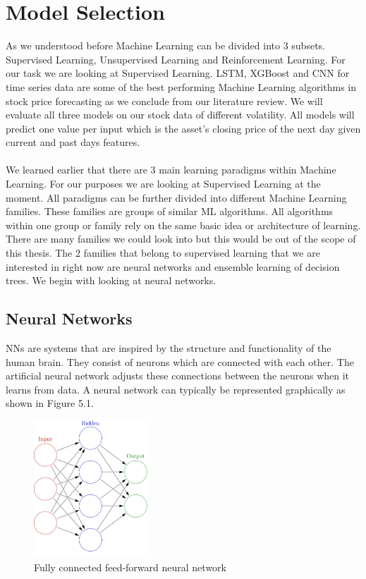 \documentclass[a4paper,12pt]{report}
\begin{document}
	\section{Model Selection}
	As we understood before Machine Learning can be divided into 3 subsets. Supervised Learning, Unsupervised Learning and Reinforcement Learning. For our task we are looking at Supervised Learning. LSTM, XGBoost and CNN for time series data are some of the best performing Machine Learning algorithms in stock price forecasting as we conclude from our literature review. We will evaluate all three models on our stock data of different volatility. All models will predict one value per input which is the asset's closing price of the next day given current and past days features.\\
	\\
	We learned earlier that there are 3 main learning paradigms within Machine Learning. For our purposes we are looking at Supervised Learning at the moment. All paradigms can be further divided into different Machine Learning families. These families are groups of similar ML algorithms. All algorithms within one group or family rely on the same basic idea or architecture of learning. There are many families we could look into but this would be out of the scope of this thesis. The 2 families that belong to supervised learning that we are interested in right now are neural networks and ensemble learning of decision trees. We begin with looking at neural networks.
	\subsection{Neural Networks}
		NNs are systems that are inspired by the structure and functionality of the human brain. They consist of neurons which are connected with each other. The artificial neural network adjusts these connections between the neurons when it learns from data. A neural network can typically be represented graphically as shown in Figure 5.1. \\
	
	
\begin{figure}
  \includegraphics[width=0.38\textwidth]{images/Colored_neural_network.svg.png}
  \caption{Fully connected feed-forward neural network}
  \label{fig:wrapped}
\end{figure}
	
\end{document}
